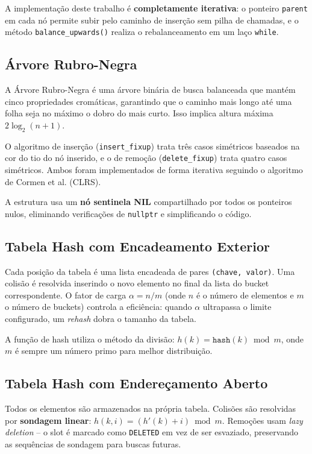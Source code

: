 \documentclass[12pt, a4paper]{article}
\begin{document}
A implementação deste trabalho é \textbf{completamente iterativa}: o ponteiro
\texttt{parent} em cada nó permite subir pelo caminho de inserção sem pilha de chamadas,
e o método \texttt{balance\_upwards()} realiza o rebalanceamento em um laço \texttt{while}.

\subsection{Árvore Rubro-Negra}

A Árvore Rubro-Negra é uma árvore binária de busca balanceada que mantém cinco
propriedades cromáticas, garantindo que o caminho mais longo até uma folha seja no
máximo o dobro do mais curto. Isso implica altura máxima $2\log_2(n+1)$.

O algoritmo de inserção (\texttt{insert\_fixup}) trata três casos simétricos baseados
na cor do tio do nó inserido, e o de remoção (\texttt{delete\_fixup}) trata quatro
casos simétricos. Ambos foram implementados de forma iterativa seguindo o algoritmo
de Cormen et al. (CLRS).

A estrutura usa um \textbf{nó sentinela NIL} compartilhado por todos os ponteiros nulos,
eliminando verificações de \texttt{nullptr} e simplificando o código.

\subsection{Tabela Hash com Encadeamento Exterior}

Cada posição da tabela é uma lista encadeada de pares \texttt{(chave, valor)}. Uma
colisão é resolvida inserindo o novo elemento no final da lista do bucket correspondente.
O fator de carga $\alpha = n/m$ (onde $n$ é o número de elementos e $m$ o número de
buckets) controla a eficiência: quando $\alpha$ ultrapassa o limite configurado, um
\textit{rehash} dobra o tamanho da tabela.

A função de hash utiliza o método da divisão: $h(k) = \texttt{hash}(k) \bmod m$, onde
$m$ é sempre um número primo para melhor distribuição.

\subsection{Tabela Hash com Endereçamento Aberto}

Todos os elementos são armazenados na própria tabela. Colisões são resolvidas por
\textbf{sondagem linear}: $h(k, i) = (h'(k) + i) \bmod m$. Remoções usam
\textit{lazy deletion} -- o slot é marcado como \texttt{DELETED} em vez de ser
esvaziado, preservando as sequências de sondagem para buscas futuras.
\end{document}
